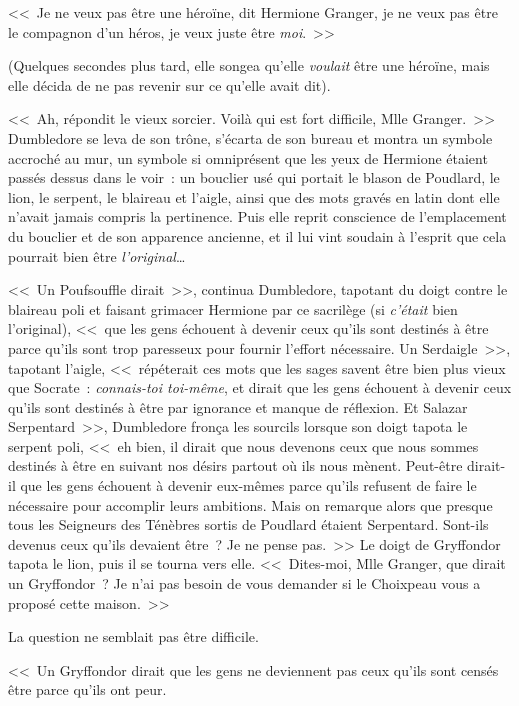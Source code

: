 <<~Je ne veux pas être une héroïne, dit Hermione Granger, je ne veux pas être le compagnon d'un héros, je veux juste être \emph{moi}.~>>

(Quelques secondes plus tard, elle songea qu'elle \emph{voulait} être une héroïne, mais elle décida de ne pas revenir sur ce qu'elle avait dit).

<<~Ah, répondit le vieux sorcier. Voilà qui est fort difficile, Mlle Granger.~>> Dumbledore se leva de son trône, s'écarta de son bureau et montra un symbole accroché au mur, un symbole si omniprésent que les yeux de Hermione étaient passés dessus dans le voir~: un bouclier usé qui portait le blason de Poudlard, le lion, le serpent, le blaireau et l'aigle, ainsi que des mots gravés en latin dont elle n'avait jamais compris la pertinence. Puis elle reprit conscience de l'emplacement du bouclier et de son apparence ancienne, et il lui vint soudain à l'esprit que cela pourrait bien être \emph{l'original}…

<<~Un Poufsouffle dirait~>>, continua Dumbledore, tapotant du doigt contre le blaireau poli et faisant grimacer Hermione par ce sacrilège (si \emph{c'était} bien l'original), <<~que les gens échouent à devenir ceux qu'ils sont destinés à être parce qu'ils sont trop paresseux pour fournir l'effort nécessaire. Un Serdaigle~>>, tapotant l'aigle, <<~répéterait ces mots que les sages savent être bien plus vieux que Socrate~: \emph{connais-toi toi-même}, et dirait que les gens échouent à devenir ceux qu'ils sont destinés à être par ignorance et manque de réflexion. Et Salazar Serpentard~>>, Dumbledore fronça les sourcils lorsque son doigt tapota le serpent poli, <<~eh bien, il dirait que nous devenons ceux que nous sommes destinés à être en suivant nos désirs partout où ils nous mènent. Peut-être dirait-il que les gens échouent à devenir eux-mêmes parce qu'ils refusent de faire le nécessaire pour accomplir leurs ambitions. Mais on remarque alors que presque tous les Seigneurs des Ténèbres sortis de Poudlard étaient Serpentard. Sont-ils devenus ceux qu'ils devaient être~? Je ne pense pas.~>> Le doigt de Gryffondor tapota le lion, puis il se tourna vers elle. <<~Dites-moi, Mlle Granger, que dirait un Gryffondor~? Je n'ai pas besoin de vous demander si le Choixpeau vous a proposé cette maison.~>>

La question ne semblait pas être difficile.

<<~Un Gryffondor dirait que les gens ne deviennent pas ceux qu'ils sont censés être parce qu'ils ont peur.

